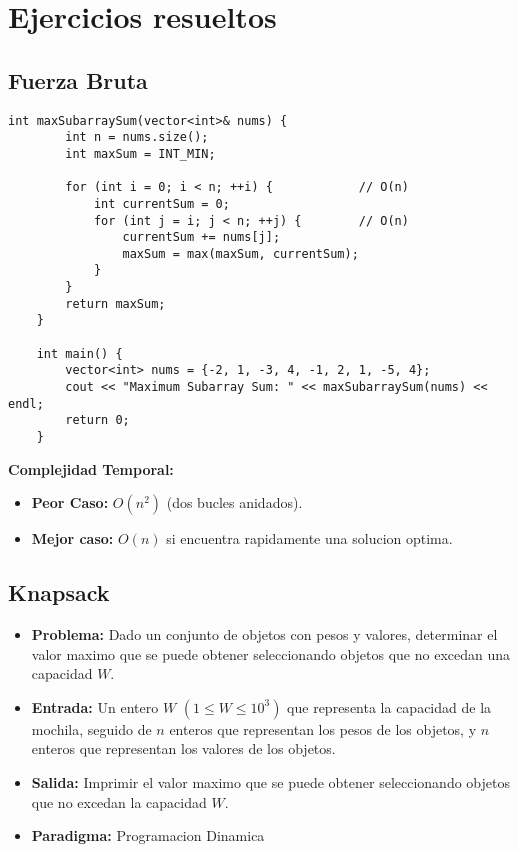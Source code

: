 \section{Ejercicios resueltos}

\subsection{Fuerza Bruta}
    \begin{lstlisting}[style=cpp]
    int maxSubarraySum(vector<int>& nums) {
        int n = nums.size();
        int maxSum = INT_MIN;
    
        for (int i = 0; i < n; ++i) {            // O(n)
            int currentSum = 0;
            for (int j = i; j < n; ++j) {        // O(n)
                currentSum += nums[j];
                maxSum = max(maxSum, currentSum);
            }
        }
        return maxSum;
    }
    
    int main() {
        vector<int> nums = {-2, 1, -3, 4, -1, 2, 1, -5, 4};
        cout << "Maximum Subarray Sum: " << maxSubarraySum(nums) << endl;
        return 0;
    }
    \end{lstlisting}
    \textbf{Complejidad Temporal: }
    \begin{itemize}
        \item \textbf{Peor Caso: }$O(n^2)$ (dos bucles anidados).
        \item \textbf{Mejor caso: }$O(n)$ si encuentra rapidamente una solucion optima.
    \end{itemize}

\subsection{Knapsack}
\begin{itemize}
  \item \textbf{Problema: }Dado un conjunto de objetos con pesos y valores, determinar el valor maximo que se puede obtener seleccionando objetos que no excedan una capacidad $W$. 
  \item \textbf{Entrada: }Un entero $W$ $(1 \leq W \leq 10^3)$ que representa la capacidad de la mochila, seguido de $n$ enteros que representan los pesos de los objetos, y $n$ enteros que representan los valores de los objetos. 
  \item \textbf{Salida: }Imprimir el valor maximo que se puede obtener seleccionando objetos que no excedan la capacidad $W$. 

  \item \textbf{Paradigma: } Programacion Dinamica
\end{itemize}
    
